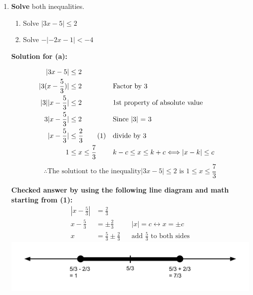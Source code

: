 \documentclass[12pt]{book}
\newcommand\numberthis{\addtocounter{equation}{1}\tag{\theequation}}
\begin{document}
\begin{enumerate}

\newpage

\item \textbf{Solve} both inequalities.

\begin{enumerate}
\item Solve $|3x-5| \le 2$
\item Solve $-|-2x-1| < -4$
\end{enumerate}

\vspace{0.3cm} 
\textbf{Solution for (a):}

\addtolength{\jot}{1em}
\begin{align*}
    |3x-5| & \le 2 \\
    |3(x - \frac{5}{3})| & \le 2 && \text{Factor by 3}\\
    |3||x - \frac{5}{3}| & \le 2 && \text{1st property of absolute value}\\
    3|x - \frac{5}{3}| & \le 2 && \text{Since |3| = 3}\\
    |x - \frac{5}{3}| & \le \frac{2}{3} \numberthis &&  \text{divide by 3}\\
    1 & \le x \le \frac{7}{3} && k - c \leq x \leq k + c \Longleftrightarrow |x-k| \leq c
\end{align*}
$$ \therefore \text{The solutiont to the inequality} |3x-5| \le 2 \text{ is } \boxed{1 \le x \le \frac{7}{3}} $$

\vspace{0.3em}
\textbf{Checked answer by using the following line diagram and math starting from (1):}
\addtolength{\jot}{0em}
\begin{align*}
    |x - \frac{5}{3}| & = \frac{2}{3}\\
    x - \frac{5}{3} & = \pm \frac{2}{3} && |x| = c \longleftrightarrow x = \pm c\\
    x & = \frac{5}{3} \pm \frac{2}{3} && \text{add $\frac{5}{3}$ to both sides}
\end{align*}
\includegraphics[width=\linewidth]{A1-2 proof 1 (1).png}


\end{enumerate}
\end{document}
